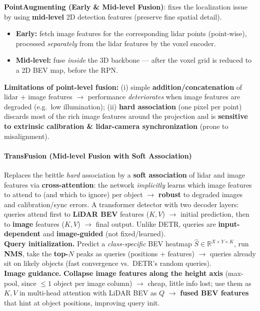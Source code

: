 \documentclass{article}
\begin{document}
\textbf{PointAugmenting (Early \& Mid-level Fusion)}: fixes the localization issue by using \textbf{mid-level} 2D detection features (preserve fine spatial detail).
\begin{itemize}
    \item \textbf{Early:} fetch image features for the corresponding lidar points (point-wise), processed \textit{separately} from the lidar features by the voxel encoder.
    \item \textbf{Mid-level:} fuse \textit{inside} the 3D backbone --- after the voxel grid is reduced to a 2D BEV map, before the RPN.
\end{itemize}

\textbf{Limitations of point-level fusion:} (i) simple \textbf{addition/concatenation} of lidar + image features $\rightarrow$ performance \textit{deteriorates} when image features are degraded (e.g.\ low illumination); (ii) \textbf{hard association} (one pixel per point) discards most of the rich image features around the projection and is \textbf{sensitive to extrinsic calibration \& lidar-camera synchronization} (prone to misalignment).

\paragraph{TransFusion (Mid-level Fusion with Soft Association)}
Replaces the brittle \textit{hard} association by a \textbf{soft association} of lidar and image features via \textbf{cross-attention}: the network \textit{implicitly} learns which image features to attend to (and which to ignore) per object $\rightarrow$ \textbf{robust} to degraded images and calibration/sync errors. A transformer detector with two decoder layers: queries attend first to \textbf{LiDAR BEV} features ($K,V$) $\rightarrow$ initial prediction, then to \textbf{image} features ($K,V$) $\rightarrow$ final output. Unlike DETR, queries are \textbf{input-dependent} and \textbf{image-guided} (not fixed/learned).\\

\textbf{Query initialization.} Predict a \textit{class-specific} BEV heatmap $\hat S\in\mathbb{R}^{X\times Y\times K}$, run \textbf{NMS}, take the \textbf{top-$N$} peaks as queries (positions + features) $\rightarrow$ queries already sit on likely objects (fast convergence vs.\ DETR's random queries).\\

\textbf{Image guidance.} \textbf{Collapse image features along the height axis} (max-pool, since $\le 1$ object per image column) $\rightarrow$ cheap, little info lost; use them as $K,V$ in multi-head attention with LiDAR BEV as $Q$ $\rightarrow$ \textbf{fused BEV features} that hint at object positions, improving query init.\\
\end{document}
